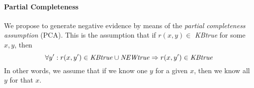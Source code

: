 

\paragraph{Partial Completeness} 
We propose to generate negative evidence by means of the \emph{partial completeness assumption} (PCA).
This is the assumption that if $r(x,y) \in$ \emph{KBtrue} for some $x,y$,
then
\[\forall y': r(x,y') \in \mbox{\emph{KBtrue}} \cup \mbox{\emph{NEWtrue}} \Rightarrow r(x,y') \in \mbox{\emph{KBtrue}}\] 
In other words, we assume that if we know one $y$ for a given $x$, then we know all $y$ for that $x$.

